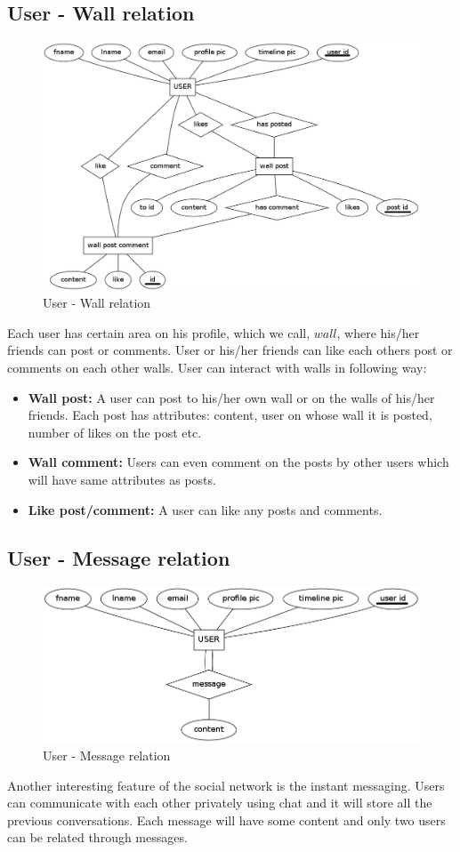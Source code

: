 \documentclass{article}
\begin{document}
\subsection{User - Wall relation}
\begin{figure}[h]
\centering
\includegraphics[scale=0.4]{user_wall.png}
\caption{User - Wall relation}
\label{fig5}
\end{figure}
Each user has certain area on his profile, which we call, $wall$, where his/her friends can post or comments. User or his/her friends can like each others post or comments on each other walls. User can interact with walls in following way:
\begin{itemize}
\item \textbf{Wall post:} A user can post to his/her own wall or on the walls of his/her friends. Each post has attributes: content, user on whose wall it is posted, number of likes on the post etc.
\item \textbf{Wall comment:} Users can even comment on the posts by other users which will have same attributes as posts.
\item \textbf{Like post/comment:} A user can like any posts and comments. 
\end{itemize}
\subsection{User - Message relation}
\begin{figure}[h]
\centering
\includegraphics[scale=0.4]{user_messages.png}
\caption{User - Message relation}
\label{fig6}
\end{figure}
Another interesting feature of the social network is the instant messaging. Users can communicate with each other privately using chat and it will store all the previous conversations. Each message will have some content and only two users can be related through messages.
\end{document}
